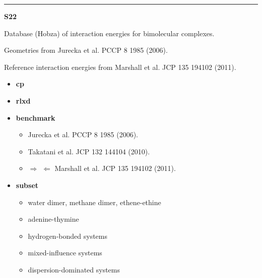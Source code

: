 \documentclass[letterpaper,10pt,english]{sphinxmanual}
\begin{document}
\bigskip\hrule{}\bigskip

\label{index:module-S22}
\textbf{S22}

\begin{DUlineblock}{0em}
\item[] Database (Hobza) of interaction energies for bimolecular complexes.
\item[] Geometries from Jurecka et al. PCCP 8 1985 (2006).
\item[] Reference interaction energies from Marshall et al. JCP 135 194102 (2011).
\end{DUlineblock}
\begin{itemize}
\item {} 
\textbf{cp}   \textbar{}\textbar{} 

\item {} 
\textbf{rlxd} 

\item {} 
\textbf{benchmark}
\begin{itemize}
\item {} 
 Jurecka et al. PCCP 8 1985 (2006).

\item {} 
 Takatani et al. JCP 132 144104 (2010).

\item {} 
$\Rightarrow$  $\Leftarrow$ Marshall et al. JCP 135 194102 (2011).

\end{itemize}

\item {} 
\textbf{subset}
\begin{itemize}
\item {} 
 water dimer, methane dimer, ethene-ethine

\item {} 
 adenine-thymine

\item {} 
 hydrogen-bonded systems

\item {} 
 mixed-influence systems

\item {} 
 dispersion-dominated systems

\end{itemize}

\end{itemize}
\end{document}
